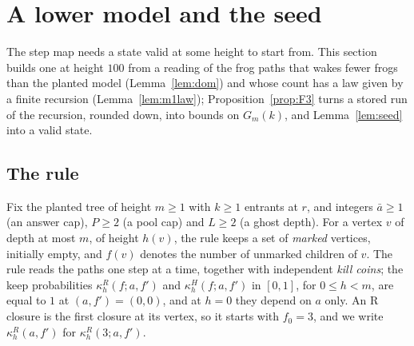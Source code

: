 \documentclass[11pt]{amsart}
\theoremstyle{definition}
\numberwithin{equation}{section}
\begin{document}
\section{A lower model and the seed}\label{sec:lower}

The step map needs a state valid at some height to start from. This section builds one at height $100$ from a reading of the frog paths that wakes fewer frogs than the planted model (Lemma~\ref{lem:dom}) and whose count has a law given by a finite recursion (Lemma~\ref{lem:m1law}); Proposition~\ref{prop:F3} turns a stored run of the recursion, rounded down, into bounds on $G_m(k)$, and Lemma~\ref{lem:seed} into a valid state.

\subsection*{The rule}
Fix the planted tree of height $m\ge1$ with $k\ge1$ entrants at $r$, and integers $\bar a\ge1$ (an answer cap), $P\ge2$ (a pool cap) and $L\ge2$ (a ghost depth). For a vertex $v$ of depth at most $m$, of height $h(v)$, the rule keeps a set of \emph{marked} vertices, initially empty, and $f(v)$ denotes the number of unmarked children of $v$. The rule reads the paths one step at a time, together with independent \emph{kill coins}; the keep probabilities $\kappa^R_h(f;a,f')$ and $\kappa^H_h(f;a,f')$ in $[0,1]$, for $0\le h<m$, are equal to $1$ at $(a,f')=(0,0)$, and at $h=0$ they depend on $a$ only. An R closure is the first closure at its vertex, so it starts with $f_0=3$, and we write $\kappa^R_h(a,f')$ for $\kappa^R_h(3;a,f')$.
\end{document}
